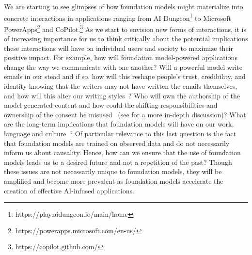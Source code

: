 We are starting to see glimpses of how foundation models might materialize into concrete interactions in applications ranging from AI Dungeon\footnote{https://play.aidungeon.io/main/home} to Microsoft PowerApps\footnote{https://powerapps.microsoft.com/en-us/} and CoPilot.\footnote{https://copilot.github.com/} As we start to envision new forms of interactions, it is of increasing importance for us to think critically about the potential implications these interactions will have on individual users and society to maximize their positive impact. For example, how will foundation model-powered applications change the way we communicate with one another? Will a powerful model write emails in our stead and if so, how will this reshape people's trust, credibility, and identity knowing that the writers may not have written the emails themselves, and how will this alter our writing styles~\citep{Hancock2020AI}? Who will own the authorship of the model-generated content and how could the shifting responsibilities and ownership of the consent be misused~\citep{Weiner2018} (see  for a more in-depth discussion)? What are the long-term implications that foundation models will have on our work, language and culture~\citep{Hancock2020AI, Buschek2021writing}? Of particular relevance to this last question is the fact that foundation models are trained on observed data and do not necessarily inform us about causality. Hence, how can we ensure that the use of foundation models leads us to a desired future and not a repetition of the past? Though these issues are not necessarily unique to foundation models, they will be amplified and become more prevalent as foundation models accelerate the creation of effective AI-infused applications. 

